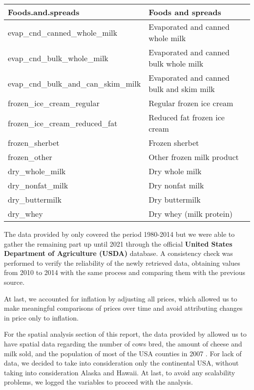 \begin{longtable}{p{6cm}p{7cm}}
    Foods.and.spreads                     & Foods and spreads                               \\
    \midrule
    evap\_cnd\_canned\_whole\_milk        & Evaporated and canned whole milk                \\
    evap\_cnd\_bulk\_whole\_milk          & Evaporated and canned bulk whole milk           \\
    evap\_cnd\_bulk\_and\_can\_skim\_milk & Evaporated and canned bulk and skim milk \\
    \midrule
    frozen\_ice\_cream\_regular           & Regular frozen ice cream                        \\
    frozen\_ice\_cream\_reduced\_fat      & Reduced fat frozen ice cream                    \\
    frozen\_sherbet                       & Frozen sherbet                                  \\
    frozen\_other                         & Other frozen milk product                       \\
    \midrule
    dry\_whole\_milk                      & Dry whole milk                                  \\
    dry\_nonfat\_milk                     & Dry nonfat milk                                 \\
    dry\_buttermilk                       & Dry buttermilk                                  \\
    dry\_whey                             & Dry whey (milk protein)                         \\
    \bottomrule
  \end{longtable}

The data provided by \cite{dataset} only covered the period 1980-2014 but we were able to gather the remaining part up until 2021 through the official \textbf{United States Department of Agriculture (USDA)} database. A consistency check was performed to verify the reliability of the newly retrieved data, obtaining values from 2010 to 2014 with the same process and comparing them with the previous source.

At last, we accounted for inflation by adjusting all prices, which allowed us to make meaningful comparisons of prices over time and avoid attributing changes in price only to inflation.

For the spatial analysis section of this report, the data provided by \cite{spatial_data} allowed us to have spatial data regarding the number of cows bred, the amount of cheese and milk sold, and the population of most of the USA counties in 2007 \cite{spatial_data_population}. For lack of data, we decided to take into consideration only the continental USA, without taking into consideration Alaska and Hawaii. At last, to avoid any scalability problems, we logged the variables to proceed with the analysis. 

